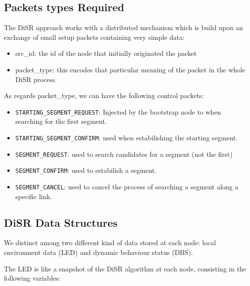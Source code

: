 \subsection{Packets types Required}

The DiSR approach works with a distributed mechanism which is build
upon an exchange of small setup packets containing very simple data:
\begin{itemize}
\item{src\_id}: the id of the node that initially originated the
packet
\item{packet\_type}: this encodes that particular meaning of the
packet in the whole DiSR process.
\end{itemize}

As regards packet\_type, we can have the following control packets:
\begin{itemize}
\item{\texttt{STARTING\_SEGMENT\_REQUEST}}: Injected by the bootstrap
node to when searching for the first segment. 
\item{\texttt{STARTING\_SEGMENT\_CONFIRM}}: used when estabilishing
the starting  segment. 
\item{\texttt{SEGMENT\_REQUEST}}: used to search candidates for a segment (not the
first)
\item{\texttt{SEGMENT\_CONFIRM}}: used to estabilish a segment. 
\item{\texttt{SEGMENT\_CANCEL}}: used to cancel the process of searching a segment along a
specific link.
\end{itemize}

\subsection{DiSR Data Structures}
\label{ssec:disr_dstruct}

We distinct among two different kind of data stored at each node:
local environment data (LED) and dynamic behaviour status (DBS).

The LED is like a snapshot of the DiSR algorithm at each node,
consisting in the following variables:


